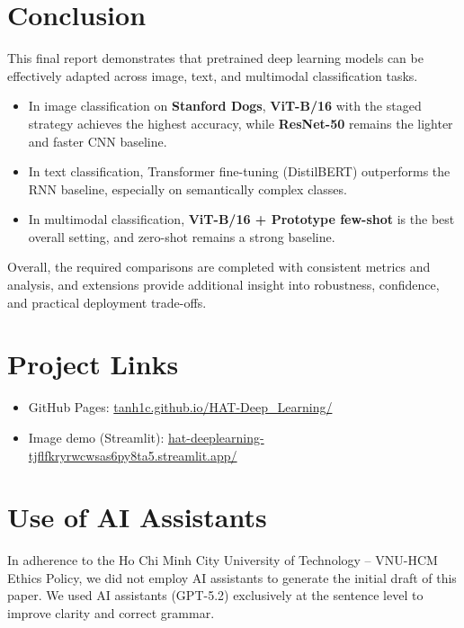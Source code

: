 \documentclass[twoside,final]{hcmut-report}
\begin{document}
\section{Conclusion}
This final report demonstrates that pretrained deep learning models can be effectively adapted across image, text, and multimodal classification tasks.
\begin{itemize}[leftmargin=*, nosep]
    \item In image classification on \textbf{Stanford Dogs}, \textbf{ViT-B/16} with the staged strategy achieves the highest accuracy, while \textbf{ResNet-50} remains the lighter and faster CNN baseline.
    \item In text classification, Transformer fine-tuning (DistilBERT) outperforms the RNN baseline, especially on semantically complex classes.
    \item In multimodal classification, \textbf{ViT-B/16 + Prototype few-shot} is the best overall setting, and zero-shot remains a strong baseline.
\end{itemize}
Overall, the required comparisons are completed with consistent metrics and analysis, and extensions provide additional insight into robustness, confidence, and practical deployment trade-offs.

\section{Project Links}
\begin{itemize}[leftmargin=*, nosep]
    \item GitHub Pages: \href{https://tanh1c.github.io/HAT-Deep_Learning/}{tanh1c.github.io/HAT-Deep\_Learning/}
    \item Image demo (Streamlit): \href{https://hat-deeplearning-tjflfkryrwcwsas6py8ta5.streamlit.app/}{hat-deeplearning-tjflfkryrwcwsas6py8ta5.streamlit.app/}
\end{itemize}

\section{Use of AI Assistants}
In adherence to the Ho Chi Minh City University of Technology -- VNU-HCM Ethics Policy, we did not employ AI assistants to generate the initial draft of this paper. We used AI assistants (GPT-5.2) exclusively at the sentence level to improve clarity and correct grammar.
\end{document}
